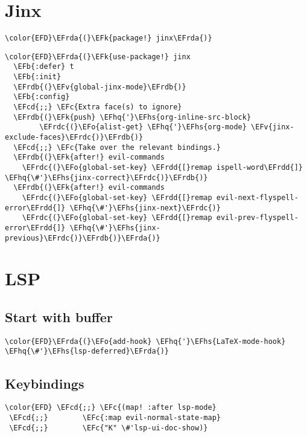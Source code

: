 \documentclass[12pt]{article}
\theoremstyle{plain}%
\theoremstyle{definition}
\theoremstyle{remark}
\newcommand{\EFc}[1]{\textcolor{EFc}{#1}} %
\newcommand{\EFcd}[1]{\textcolor{EFcd}{#1}} %
\newcommand{\EFk}[1]{\textcolor{EFk}{#1}} %
\newcommand{\EFb}[1]{\textcolor{EFb}{#1}} %
\newcommand{\EFv}[1]{\textcolor{EFv}{#1}} %
\newcommand{\EFo}[1]{\textcolor{EFo}{#1}} %
\newcommand{\EFhq}[1]{\textcolor{EFhq}{#1}} %
\newcommand{\EFhs}[1]{\textcolor{EFhs}{#1}} %
\newcommand{\EFrda}[1]{\textcolor{EFrda}{#1}} %
\newcommand{\EFrdb}[1]{\textcolor{EFrdb}{#1}} %
\newcommand{\EFrdc}[1]{\textcolor{EFrdc}{#1}} %
\newcommand{\EFrdd}[1]{\textcolor{EFrdd}{#1}} %
\begin{document}
\section{Jinx}
\label{sec:orgaf52a63}
\begin{Code}
\begin{Verbatim}
\color{EFD}\EFrda{(}\EFk{package!} jinx\EFrda{)}
\end{Verbatim}
\end{Code}
\begin{Code}
\begin{Verbatim}
\color{EFD}\EFrda{(}\EFk{use-package!} jinx
  \EFb{:defer} t
  \EFb{:init}
  \EFrdb{(}\EFv{global-jinx-mode}\EFrdb{)}
  \EFb{:config}
  \EFcd{;;} \EFc{Extra face(s) to ignore}
  \EFrdb{(}\EFk{push} \EFhq{'}\EFhs{org-inline-src-block}
        \EFrdc{(}\EFo{alist-get} \EFhq{'}\EFhs{org-mode} \EFv{jinx-exclude-faces}\EFrdc{)}\EFrdb{)}
  \EFcd{;;} \EFc{Take over the relevant bindings.}
  \EFrdb{(}\EFk{after!} evil-commands
    \EFrdc{(}\EFo{global-set-key} \EFrdd{[}remap ispell-word\EFrdd{]} \EFhq{\#'}\EFhs{jinx-correct}\EFrdc{)}\EFrdb{)}
  \EFrdb{(}\EFk{after!} evil-commands
    \EFrdc{(}\EFo{global-set-key} \EFrdd{[}remap evil-next-flyspell-error\EFrdd{]} \EFhq{\#'}\EFhs{jinx-next}\EFrdc{)}
    \EFrdc{(}\EFo{global-set-key} \EFrdd{[}remap evil-prev-flyspell-error\EFrdd{]} \EFhq{\#'}\EFhs{jinx-previous}\EFrdc{)}\EFrdb{)}\EFrda{)}
\end{Verbatim}
\end{Code}
\section{LSP}
\label{sec:orgbb53734}
\subsection{Start with buffer}
\label{sec:org1ef973c}
\begin{Code}
\begin{Verbatim}
\color{EFD}\EFrda{(}\EFo{add-hook} \EFhq{'}\EFhs{LaTeX-mode-hook} \EFhq{\#'}\EFhs{lsp-deferred}\EFrda{)}
\end{Verbatim}
\end{Code}
\subsection{Keybindings}
\label{sec:orga30d25e}
\begin{Code}
\begin{Verbatim}
\color{EFD} \EFcd{;;} \EFc{(map! :after lsp-mode}
 \EFcd{;;}        \EFc{:map evil-normal-state-map}
 \EFcd{;;}        \EFc{"K" \#'lsp-ui-doc-show)}

\end{Verbatim}
\end{Code}
\end{document}
